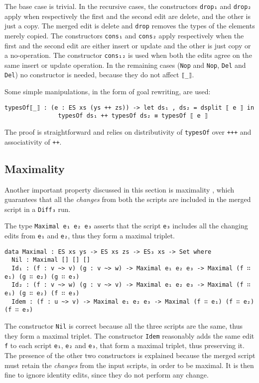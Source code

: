\documentclass[../Thesis.tex]{subfiles}
\begin{document}
	The base case is trivial.
	In the recursive cases, the constructors \texttt{drop₁} and \texttt{drop₂} 
	apply when respectively the first and the second edit are delete, and the
	other is just a copy. The merged edit is delete and \texttt{drop} removes
	the types of the elements merely copied.
	The constructors \texttt{cons₁} and \texttt{cons₂} apply respectively
	when the first and the second edit are either insert or update and the other
	is just copy or a no-operation.
	The constructor \texttt{cons₁₂} is used when both the edits agree on the
	same insert or update operation. In the remaining cases (\texttt{Nop} and 
	\texttt{Nop}, \texttt{Del} and \texttt{Del}) no constructor is needed, because
	they do not affect \texttt{⟦\_⟧}.
	
	Some simple manipulations, in the form of goal rewriting, are used:
\begin{verbatim}
typesOf⟦_⟧ : (e : ES xs (ys ++ zs)) -> let ds₁ , ds₂ = dsplit ⟦ e ⟧ in 
               typesOf ds₁ ++ typesOf ds₂ ≡ typesOf ⟦ e ⟧
\end{verbatim}
	The proof is straightforward and relies on distributivity of \texttt{typesOf} over \texttt{+++} and associativity of \texttt{++}.

	\subsection{Maximality}
	\label{subsec:Maximality}
	Another important property discussed in this section is maximality 
	\cite{Pierce07}, which guarantees that all the \emph{changes} from both
	the scripts are included in the merged script in a \texttt{Diff₃} run.
		
	The type \texttt{Maximal e₁ e₂ e₃} asserts that the script \texttt{e₃} includes
	all the changing edits from \texttt{e₁} and \texttt{e₂}, thus they
	form a maximal triplet.
	
\begin{verbatim}
data Maximal : ES xs ys -> ES xs zs -> ES₃ xs -> Set where
  Nil : Maximal [] [] []
  Id₁ : (f : v ~> v) (g : v ~> w) -> Maximal e₁ e₂ e₃ -> Maximal (f ∷ e₁) (g ∷ e₂) (g ∷ e₃)
  Id₂ : (f : v ~> w) (g : v ~> v) -> Maximal e₁ e₂ e₃ -> Maximal (f ∷ e₁) (g ∷ e₂) (f ∷ e₃)
  Idem : (f : u ~> v) -> Maximal e₁ e₂ e₃ -> Maximal (f ∷ e₁) (f ∷ e₂) (f ∷ e₃)
\end{verbatim}

	The constructor \texttt{Nil} is correct because all the three scripts
	are the same, thus they form a maximal triplet.
	The constructor \texttt{Idem} reasonably adds the same edit \texttt{f} 
	to each script \texttt{e₁}, \texttt{e₂} and \texttt{e₃}, that form a maximal 
	triplet, thus preserving it.
	The presence of the other two constructors is explained because 
	the merged script must retain the \emph{changes} from the 
	input scripts, in order to be maximal.
	It is then fine to ignore identity edits, since they do not perform any 
	change.
	
\end{document}
